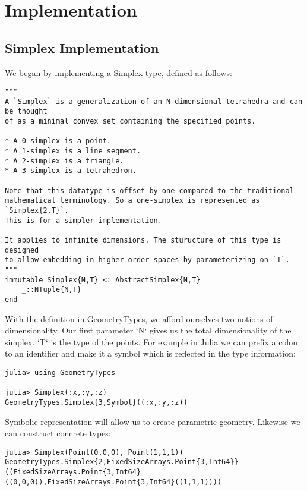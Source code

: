 \chapter{Implementation}

\section{Simplex Implementation}

We began by implementing a Simplex type, defined as follows:

\begin{lstlisting}
"""
A `Simplex` is a generalization of an N-dimensional tetrahedra and can be thought
of as a minimal convex set containing the specified points.

* A 0-simplex is a point.
* A 1-simplex is a line segment.
* A 2-simplex is a triangle.
* A 3-simplex is a tetrahedron.

Note that this datatype is offset by one compared to the traditional
mathematical terminology. So a one-simplex is represented as `Simplex{2,T}`.
This is for a simpler implementation.

It applies to infinite dimensions. The sturucture of this type is designed
to allow embedding in higher-order spaces by parameterizing on `T`.
"""
immutable Simplex{N,T} <: AbstractSimplex{N,T}
    _::NTuple{N,T}
end
\end{lstlisting}

With the definition in GeometryTypes, we afford ourselves two notions of
dimensionality. Our first parameter `N` gives us the total dimensionality
of the simplex. `T` is the type of the points. For example in Julia we can
prefix a colon to an identifier and make it a symbol which is reflected
in the type information:

\begin{lstlisting}
julia> using GeometryTypes

julia> Simplex(:x,:y,:z)
GeometryTypes.Simplex{3,Symbol}((:x,:y,:z))
\end{lstlisting}

Symbolic representation will allow us to create parametric geometry.
Likewise we can construct concrete types:

\begin{lstlisting}
julia> Simplex(Point(0,0,0), Point(1,1,1))
GeometryTypes.Simplex{2,FixedSizeArrays.Point{3,Int64}}((FixedSizeArrays.Point{3,Int64}((0,0,0)),FixedSizeArrays.Point{3,Int64}((1,1,1))))
\end{lstlisting}

